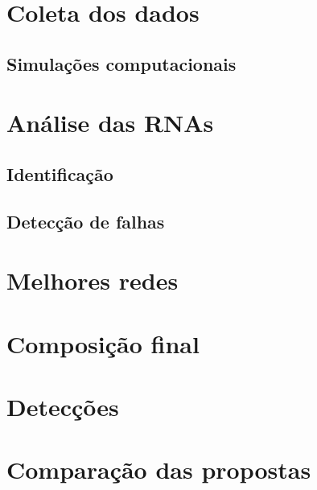 \label{cap:resultados}

\section{Coleta dos dados}

\subsection{Simulações computacionais}


\section{Análise das RNAs}

\subsection{Identificação}

\subsection{Detecção de falhas}

\section{Melhores redes}

\section{Composição final}

\section{Detecções}

\section{Comparação das propostas}
